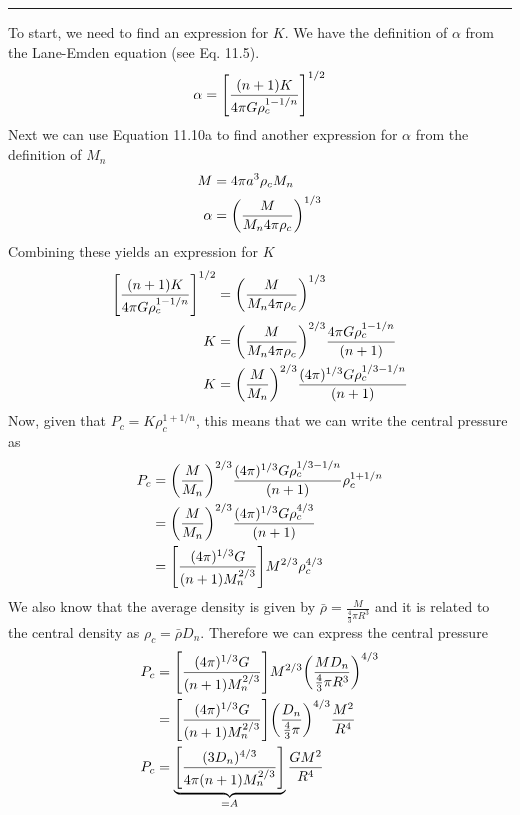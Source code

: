 \documentclass[12pt, letterpaper, twoside]{article}
\newcommand{\answer}[1]{
    \par\noindent\rule{\textwidth}{0.4pt}#1\vspace{0.5cm}
}
\begin{document}
\answer{
    To start, we need to find an expression for $K$. We have the definition of $\alpha$ from the Lane-Emden equation (see Eq. 11.5).
    \begin{equation}
        \alpha = \qty[\frac{(n + 1) K}{4 \pi G \rho_c^{1 - 1/n}}]^{1/2}
    \end{equation}
    Next we can use Equation 11.10a to find another expression for $\alpha$ from the definition of $M_n$
    \begin{align}
        M &= 4 \pi a^3 \rho_c M_n \\
        \alpha &= \qty(\frac{M}{M_n 4 \pi \rho_c})^{1/3}
    \end{align}
    Combining these yields an expression for $K$
    \begin{align}
        \qty[\frac{(n + 1) K}{4 \pi G \rho_c^{1 - 1/n}}]^{1/2} &= \qty(\frac{M}{M_n 4 \pi \rho_c})^{1/3} \\
        K &= \qty(\frac{M}{M_n 4 \pi \rho_c})^{2/3} \frac{4 \pi G \rho_c^{1 - 1 / n}}{(n + 1)} \\
        K &= \qty(\frac{M}{M_n})^{2/3} \frac{(4 \pi)^{1/3} G \rho_c^{1/3 - 1 / n}}{(n + 1)}
    \end{align}
    Now, given that $P_c = K \rho_c^{1 + 1/n}$, this means that we can write the central pressure as
    \begin{align}
        P_c &= \qty(\frac{M}{M_n})^{2/3} \frac{(4 \pi)^{1/3} G \rho_c^{1/3 - 1 / n}}{(n + 1)} \rho_c^{1 + 1 / n} \\
            &= \qty(\frac{M}{M_n})^{2/3} \frac{(4 \pi)^{1/3} G \rho_c^{4/3}}{(n + 1)} \\
            &= \qty[\frac{(4 \pi)^{1/3} G}{(n + 1) M_n^{2/3}}] M^{2/3} \rho_c^{4/3}
    \end{align}
    We also know that the average density is given by $\bar{\rho} = \frac{M}{\frac{4}{3} \pi R^3}$ and it is related to the central density as $\rho_c = \bar{\rho} D_n$. Therefore we can express the central pressure
    \begin{align}
        P_c &= \qty[\frac{(4 \pi)^{1/3} G}{(n + 1) M_n^{2/3}}] M^{2/3} \qty(\frac{M D_n}{\frac{4}{3} \pi R^3})^{4/3} \\
            &= \qty[\frac{(4 \pi)^{1/3} G}{(n + 1) M_n^{2/3}}] \qty(\frac{D_n}{\frac{4}{3} \pi})^{4/3} \frac{M^2}{R^4} \\
        P_c &= \underbrace{\qty[\frac{(3 D_n)^{4/3}}{4 \pi (n + 1) M_n^{2/3}}]}_{=A} \frac{G M^2}{R^4}
    \end{align}
}
\end{document}
